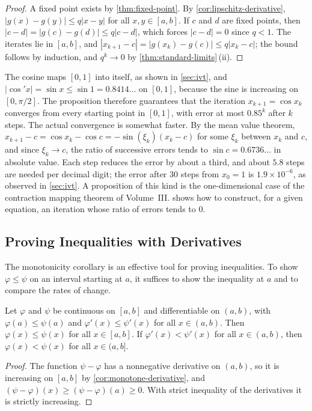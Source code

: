 \begin{proof}
A fixed point exists by \cref{thm:fixed-point}. By \cref{cor:lipschitz-derivative}, $|g(x)-g(y)|\le q|x-y|$ for all $x,y\in[a,b]$. If $c$ and $d$ are fixed points, then $|c-d|=|g(c)-g(d)|\le q|c-d|$, which forces $|c-d|=0$ since $q<1$. The iterates lie in $[a,b]$, and $|x_{k+1}-c|=|g(x_k)-g(c)|\le q|x_k-c|$; the bound follows by induction, and $q^k\to0$ by \cref{thm:standard-limits}\,(ii).
\end{proof}

The cosine maps $[0,1]$ into itself, as shown in \cref{sec:ivt}, and $|\cos'x|=\sin x\le\sin1=0.8414\ldots$ on $[0,1]$, because the sine is increasing on $[0,\pi/2]$. The proposition therefore guarantees that the iteration $x_{k+1}=\cos x_k$ converges from every starting point in $[0,1]$, with error at most $0.85^k$ after $k$ steps. The actual convergence is somewhat faster. By the mean value theorem, $x_{k+1}-c=\cos x_k-\cos c=-\sin(\xi_k)(x_k-c)$ for some $\xi_k$ between $x_k$ and $c$, and since $\xi_k\to c$, the ratio of successive errors tends to $\sin c=0.6736\ldots$ in absolute value. Each step reduces the error by about a third, and about $5.8$ steps are needed per decimal digit; the error after $30$ steps from $x_0=1$ is $1.9\times10^{-6}$, as observed in \cref{sec:ivt}. A proposition of this kind is the one-dimensional case of the contraction mapping theorem of Volume~III.  shows how to construct, for a given equation, an iteration whose ratio of errors tends to $0$.

\subsection{Proving Inequalities with Derivatives}

The monotonicity corollary is an effective tool for proving inequalities. To show $\varphi\le\psi$ on an interval starting at $a$, it suffices to show the inequality at $a$ and to compare the rates of change.

\begin{lemma}[Comparison]
\label{lem:comparison}
Let $\varphi$ and $\psi$ be continuous on $[a,b]$ and differentiable on $(a,b)$, with $\varphi(a)\le\psi(a)$ and $\varphi'(x)\le\psi'(x)$ for all $x\in(a,b)$. Then $\varphi(x)\le\psi(x)$ for all $x\in[a,b]$. If $\varphi'(x)<\psi'(x)$ for all $x\in(a,b)$, then $\varphi(x)<\psi(x)$ for all $x\in(a,b]$.
\end{lemma}

\begin{proof}
The function $\psi-\varphi$ has a nonnegative derivative on $(a,b)$, so it is increasing on $[a,b]$ by \cref{cor:monotone-derivative}, and $(\psi-\varphi)(x)\ge(\psi-\varphi)(a)\ge0$. With strict inequality of the derivatives it is strictly increasing.
\end{proof}

